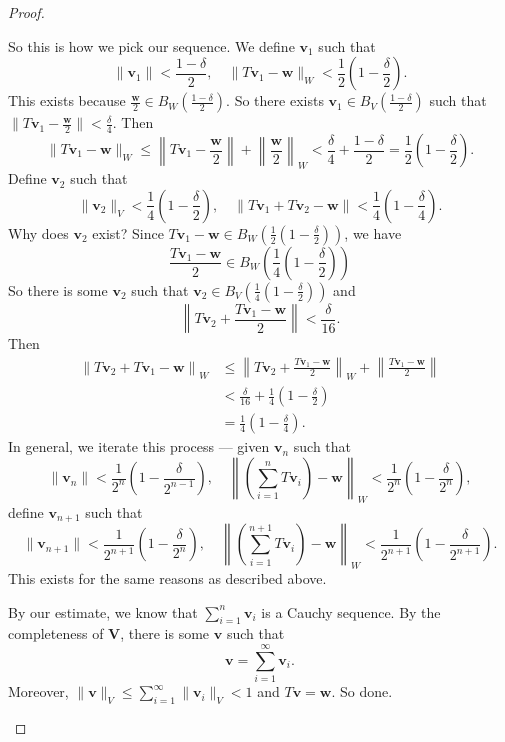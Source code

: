 \documentclass[a4paper]{article}
\begin{document}
\begin{proof}
\begin{enumerate}
      So this is how we pick our sequence. We define $\mathbf{v}_1$ such that
      \[
        \|\mathbf{v}_1\|  < \frac{1 - \delta}{2}, \quad \|T\mathbf{v}_1 - \mathbf{w}\|_W < \frac{1}{2}\left(1 - \frac{\delta}{2}\right).
      \]
      This exists because $\frac{\mathbf{w}}{2} \in B_W\left(\frac{1 - \delta}{2}\right)$. So there exists $\mathbf{v}_1 \in B_V\left(\frac{1 - \delta}{2}\right)$ such that $\|T\mathbf{v}_1 - \frac{\mathbf{w}}{2}\| < \frac{\delta}{4}$. Then
      \[
        \|T\mathbf{v}_1 - \mathbf{w}\|_W \leq \left\|T\mathbf{v}_1 - \frac{\mathbf{w}}{2}\right\| + \left\|\frac{\mathbf{w}}{2}\right\|_W < \frac{\delta}{4} + \frac{1 - \delta}{2} = \frac{1}{2}\left(1 - \frac{\delta}{2}\right).
      \]
      Define $\mathbf{v}_2$ such that
      \[
        \|\mathbf{v}_2\|_V < \frac{1}{4}\left(1 - \frac{\delta}{2}\right), \quad \|T\mathbf{v}_1 + T\mathbf{v}_2 - \mathbf{w}\| < \frac{1}{4}\left(1 - \frac{\delta}{4}\right).
      \]
      Why does $\mathbf{v}_2$ exist? Since $T \mathbf{v}_1 - \mathbf{w} \in B_W\left(\frac{1}{2}\left(1 - \frac{\delta}{2}\right)\right)$, we have
      \[
        \frac{T\mathbf{v}_1 - \mathbf{w}}{2}\in B_W\left(\frac{1}{4}\left(1 - \frac{\delta}{2}\right)\right)
      \]
      So there is some $\mathbf{v}_2$ such that $\mathbf{v}_2 \in B_V\left(\frac{1}{4}\left(1 - \frac{\delta}{2}\right)\right)$ and
      \[
        \left\|T\mathbf{v}_2 + \frac{T\mathbf{v}_1 - \mathbf{w}}{2}\right\| < \frac{\delta}{16}.
      \]
      Then
      \begin{align*}
        \left\|T\mathbf{v}_2 + T\mathbf{v}_1 - \mathbf{w}\right\|_W &\leq \left\|T\mathbf{v}_2 + \frac{T\mathbf{v}_1 - \mathbf{w}}{2}\right\|_W + \left\|\frac{T\mathbf{v}_1 - \mathbf{w}}{2}\right\| \\
        &< \frac{\delta}{16} + \frac{1}{4}\left(1 - \frac{\delta}{2}\right) \\
        &= \frac{1}{4}\left(1 - \frac{\delta}{4}\right).
      \end{align*}
      In general, we iterate this process --- given $\mathbf{v}_n$ such that
      \[
        \|\mathbf{v}_n\| < \frac{1}{2^n}\left(1 - \frac{\delta}{2^{n - 1}}\right),\quad \left\|\left(\sum_{i = 1}^n T\mathbf{v}_i\right) - \mathbf{w}\right\|_W < \frac{1}{2^n} \left(1 - \frac{\delta}{2^n}\right),
      \]
      define $\mathbf{v}_{n + 1}$ such that
      \[
        \|\mathbf{v}_{n + 1}\| < \frac{1}{2^{n + 1}}\left(1 - \frac{\delta}{2^n}\right),\quad \left\|\left(\sum_{i = 1}^{n + 1} T\mathbf{v}_i\right) - \mathbf{w}\right\|_W < \frac{1}{2^{n + 1}} \left(1 - \frac{\delta}{2^{n + 1}}\right).
      \]
      This exists for the same reasons as described above.

      By our estimate, we know that $\sum_{i = 1}^n \mathbf{v}_i$ is a Cauchy sequence.  By the completeness of $\mathbf{V}$,  there is some $\mathbf{v}$ such that
      \[
        \mathbf{v} = \sum_{i = 1}^\infty \mathbf{v}_i.
      \]
      Moreover, $\|\mathbf{v}\|_V \leq \sum_{i = 1}^\infty \|\mathbf{v}_i\|_V < 1$ and $T\mathbf{v} = \mathbf{w}$. So done.
  \end{enumerate}
\end{proof}
\end{document}
